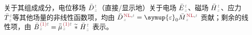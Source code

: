 关于其组成成分，电位移场 $\bar{D}^{\;\!\mathcolor{gray}{t}}_{\;\!\mathcolor{gray}{z}}$（直接/显示地）关于电场 $\bar{E}^{\;\!\mathcolor{gray}{t}}_{\;\!\mathcolor{gray}{z}}$、磁场 $\bar{H}^{\;\!\mathcolor{gray}{t}}_{\;\!\mathcolor{gray}{z}}$、应力 $\bar{T}^{\;\!\mathcolor{gray}{t}}_{\;\!\mathcolor{gray}{z}}$等其他场量的非线性函数项，均由 $\bar{D}^{\;\!\textcolor{Maroon}{\text{NL}}, \mathcolor{gray}{t}}_{\;\!\mathcolor{gray}{z}} = {\symup{\varepsilon}}_0 \bar{M}^{\;\!\textcolor{Maroon}{\text{NL}}, \mathcolor{gray}{t}}_{\;\!\mathcolor{gray}{z}}$ 贡献；剩余的线性项，由 $\bar{B}^{\;\!\textcolor{Maroon}{\text{(1)}} \mathcolor{gray}{t}}_{\;\!\mathcolor{gray}{z}} = \bar{\bar{\mu}}^{\;\!\textcolor{Maroon}{\text{(1)}} \mathcolor{gray}{t}}_{\;\!\mathcolor{gray}{z}}~\widetilde *~\bar{H}^{\;\!\mathcolor{gray}{t}}_{\;\!\mathcolor{gray}{z}}$ 表示。


